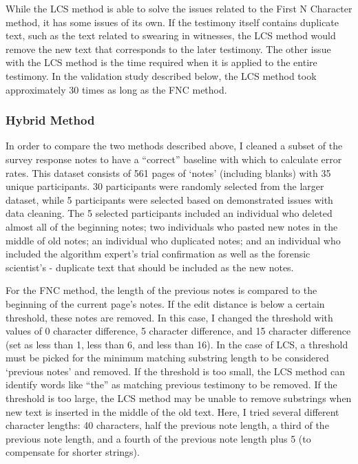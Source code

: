\documentclass[print]{nuthesis}
\begin{document}
While the LCS method is able to solve the issues related to the First N Character method, it has some issues of its own.
If the testimony itself contains duplicate text, such as the text related to swearing in witnesses, the LCS method would remove the new text that corresponds to the later testimony.
The other issue with the LCS method is the time required when it is applied to the entire testimony.
In the validation study described below, the LCS method took approximately 30 times as long as the FNC method.

\hypertarget{hybrid-method}{%
\subsubsection{Hybrid Method}\label{hybrid-method}}

In order to compare the two methods described above, I cleaned a subset of the survey response notes to have a ``correct'' baseline with which to calculate error rates.
This dataset consists of 561 pages of `notes' (including blanks) with 35 unique participants.
30 participants were randomly selected from the larger dataset, while 5 participants were selected based on demonstrated issues with data cleaning.
The 5 selected participants included an individual who deleted almost all of the beginning notes; two individuals who pasted new notes in the middle of old notes; an individual who duplicated notes; and an individual who included the algorithm expert's trial confirmation as well as the forensic scientist's - duplicate text that should be included as the new notes.

For the FNC method, the length of the previous notes is compared to the beginning of the current page's notes.
If the edit distance is below a certain threshold, these notes are removed.
In this case, I changed the threshold with values of 0 character difference, 5 character difference, and 15 character difference (set as less than 1, less than 6, and less than 16).
In the case of LCS, a threshold must be picked for the minimum matching substring length to be considered `previous notes' and removed.
If the threshold is too small, the LCS method can identify words like ``the'' as matching previous testimony to be removed.
If the threshold is too large, the LCS method may be unable to remove substrings when new text is inserted in the middle of the old text.
Here, I tried several different character lengths: 40 characters, half the previous note length, a third of the previous note length, and a fourth of the previous note length plus 5 (to compensate for shorter strings).
\end{document}
